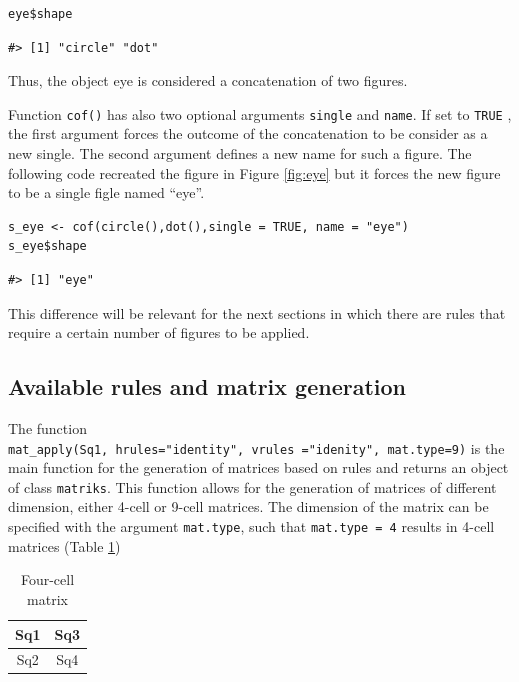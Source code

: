 \begin{verbatim}
eye$shape
\end{verbatim}

\begin{verbatim}
#> [1] "circle" "dot"
\end{verbatim}

Thus, the object eye is considered a concatenation of two figures.

Function \texttt{cof()} has also two optional arguments \texttt{single} and \texttt{name}. If set to \texttt{TRUE} ,
the first argument forces the outcome of the concatenation to be consider as a new single.
The second argument defines a new name for such a figure.
The following code recreated the figure in Figure \ref{fig:eye} but it forces the new figure to be a single figle named ``eye''.

\begin{verbatim}
s_eye <- cof(circle(),dot(),single = TRUE, name = "eye")
s_eye$shape
\end{verbatim}

\begin{verbatim}
#> [1] "eye"
\end{verbatim}

This difference will be relevant for the next sections in which there are rules that require a certain number of figures to be applied.

\hypertarget{available-rules-and-matrix-generation}{%
\subsection{Available rules and matrix generation}\label{available-rules-and-matrix-generation}}

The function \texttt{mat\_apply(Sq1,\ hrules="identity",\ vrules\ ="idenity",\ mat.type=9)} is the main function for the generation of matrices based on rules and returns an object of class \texttt{matriks}.
This function allows for the generation of matrices of different dimension, either 4-cell or 9-cell matrices.
The dimension of the matrix can be specified with the argument \texttt{mat.type}, such that \texttt{mat.type\ =\ 4} results in 4-cell matrices (Table \ref{tab:fourCell-static})

\begin{table}

\caption{\label{tab:fourCell-static}Four-cell matrix}
\centering
\begin{tabular}[t]{c|c}
\hline
Sq1 & Sq3\\
\hline
Sq2 & Sq4\\
\hline
\end{tabular}
\end{table}

